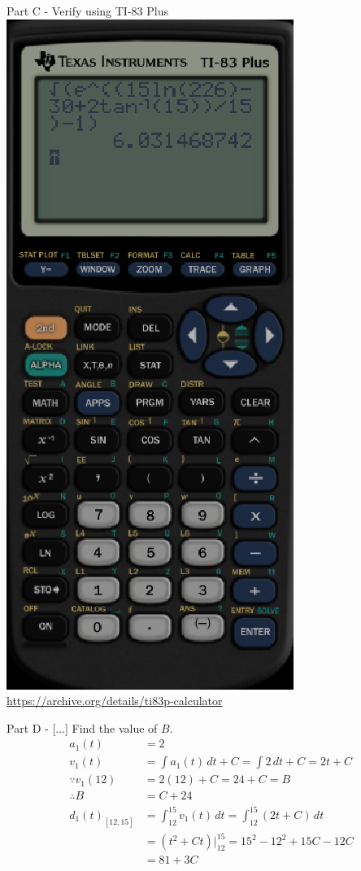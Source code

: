 \documentclass{beamer}
\begin{document}
\begin{frame}{Part C - Verify using TI-83 Plus}
    \includegraphics[scale=0.33]{7}\\
    \tiny \url{https://archive.org/details/ti83p-calculator}
\end{frame}













\begin{frame}{Part D - [...] Find the value of $B$.}
    \begin{align*}
    a_1(t)&=2\\
    v_1(t)&=\int a_1(t) \, dt + C = \int 2 \, dt + C = 2t + C\\
    \because v_1(12)&=2(12)+C=24+C=B\\
    \therefore B&=C+24\\
    d_1(t)_{[12,15]} &= \int_{12}^{15} v_1(t) \, dt = \int_{12}^{15} (2t+C) \, dt\\
    &= (t^2+Ct)\bigg|_{12}^{15} = 15^2-12^2+15C-12C\\
    &=81+3C
    \end{align*}
\end{frame}
\end{document}
